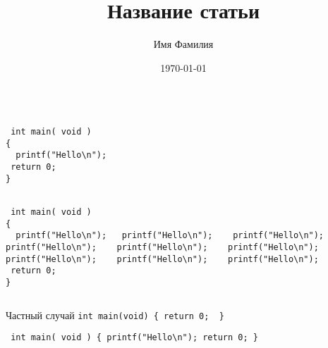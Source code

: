 \documentclass[a4paper,12pt]{article}
\author{Имя Фамилия}
\title{Название статьи}
\date{\today}
\begin{document}
\maketitle

\begin{verbatim}

 int main( void )
{
  printf("Hello\n");
 return 0;
}
\end{verbatim}

\sloppy


\begin{verbatim}

 int main( void )
{
  printf("Hello\n");   printf("Hello\n");    printf("Hello\n");    printf("Hello\n");    printf("Hello\n");    printf("Hello\n");    printf("Hello\n");    printf("Hello\n");    printf("Hello\n");
 return 0;
}
\end{verbatim}

\inputminted[linenos]{tex}{example06.tex}

Частный случай \verb`int main(void) { return 0;  }`



\begin{verbatim} int main( void ) { printf("Hello\n"); return 0; } \end{verbatim}
\end{document}
